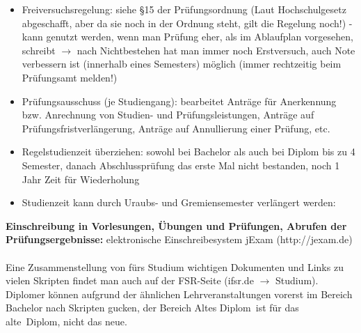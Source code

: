 \documentclass[a4paper,12pt]{report}
\begin{document}
\begin{itemize}
	\item Freiversuchsregelung: siehe \S15 der Prüfungsordnung (Laut Hochschulgesetz abgeschafft, aber da sie noch in der Ordnung steht, gilt die Regelung noch!) - kann genutzt werden, wenn man Prüfung eher, als im Ablaufplan vorgesehen, schreibt $\rightarrow$ nach Nichtbestehen hat man immer noch Erstversuch, auch Note verbessern ist (innerhalb eines Semesters) möglich (immer rechtzeitig beim Prüfungsamt melden!)
	\item Prüfungsausschuss (je Studiengang): bearbeitet Anträge für Anerkennung bzw. Anrechnung von Studien- und Prüfungsleistungen, Anträge auf Prüfungsfristverlängerung, Anträge auf Annullierung einer Prüfung, etc.
	\item Regelstudienzeit überziehen: sowohl bei Bachelor als auch bei Diplom bis zu 4 Semester, danach Abschlussprüfung das erste Mal nicht bestanden, noch 1 Jahr Zeit für Wiederholung
	\item Studienzeit kann durch Uraubs- und Gremiensemester verlängert werden:
\end{itemize}

\textbf{Einschreibung in Vorlesungen, Übungen und Prüfungen, Abrufen der Prüfungsergebnisse: }elektronische Einschreibesystem jExam (http://jexam.de)\\\\
Eine Zusammenstellung von fürs Studium wichtigen Dokumenten und Links zu vielen Skripten findet man auch auf der FSR-Seite (ifsr.de $\rightarrow$ Studium).
Diplomer können aufgrund der ähnlichen Lehrveranstaltungen vorerst im Bereich Bachelor nach Skripten gucken, der Bereich \glqq Altes Diplom\grqq\ ist für das \glqq alte\grqq\ Diplom, nicht das neue.
\end{document}
